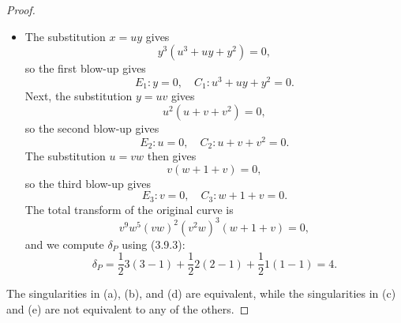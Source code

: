 \documentclass[a4paper]{article}
\begin{document}
\begin{enumerate} [label=\textbf{\arabic*.}, leftmargin=0em]
\begin{proof}
\begin{itemize} [leftmargin=0cm]
                  \item[(e)] The substitution $x = uy$ gives
                        \begin{equation*}
                            y^3(u^3 + uy + y^2) = 0,
                        \end{equation*}
                        so the first blow-up gives
                        \begin{equation*}
                            E_1 : y = 0, \quad C_1 : u^3 + uy + y^2 = 0.
                        \end{equation*}
                        Next, the substitution $y = uv$ gives
                        \begin{equation*}
                            u^2(u + v + v^2) = 0,
                        \end{equation*}
                        so the second blow-up gives
                        \begin{equation*}
                            E_2 : u = 0, \quad C_2 : u + v + v^2 = 0.
                        \end{equation*}
                        The substitution $u = vw$ then gives
                        \begin{equation*}
                            v(w + 1 + v) = 0,
                        \end{equation*}
                        so the third blow-up gives
                        \begin{equation*}
                            E_3 : v = 0, \quad C_3 : w + 1 + v = 0.
                        \end{equation*}
                        The total transform of the original curve is
                        \begin{equation*}
                            v^9 w^5 (vw)^2(v^2w)^3(w + 1 + v) = 0,
                        \end{equation*}
                        and we compute $\delta_P$ using (3.9.3):
                        \begin{equation*}
                            \delta_P = \frac{1}{2}3(3 - 1) + \frac{1}{2}2(2 - 1) + \frac{1}{2}1(1 - 1) = 4.
                        \end{equation*}
              \end{itemize}

              The singularities in (a), (b), and (d) are equivalent, while the singularities in (c) and (e) are not equivalent to any of the others.
          \end{proof}

\end{enumerate}
\end{document}
